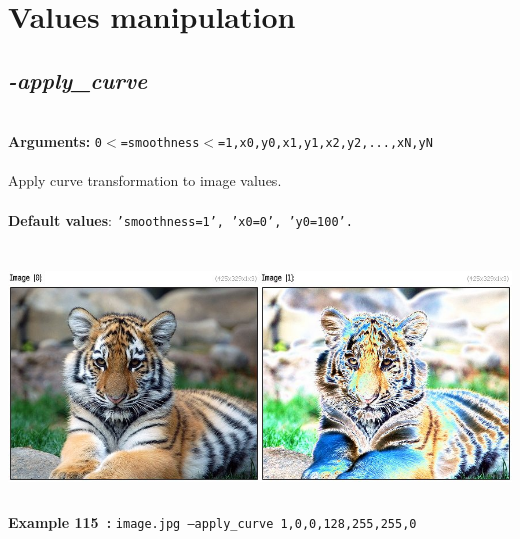 \documentclass[a4paper,11pt,twoside]{book}
\begin{document}
\section{Values manipulation}


\subsection{\emph{-apply\_curve} }\vspace*{-0.5em}
~\\\textbf{Arguments: } 
{\small \texttt{0$<$=smoothness$<$=1,x0,y0,x1,y1,x2,y2,...,xN,yN}}\\~\\
Apply curve transformation to image values.
~\\~\\\textbf{Default values}: {\small \texttt{'smoothness=1', 'x0=0', 'y0=100'.}}
\begin{center}\includegraphics[keepaspectratio=true,height=7cm,width=\textwidth]{img/gmic_def115.jpg}\\
{\footnotesize \textbf{Example 115~:} \texttt{image.jpg --apply\_curve 1,0,0,128,255,255,0}}
\end{center}
\end{document}
